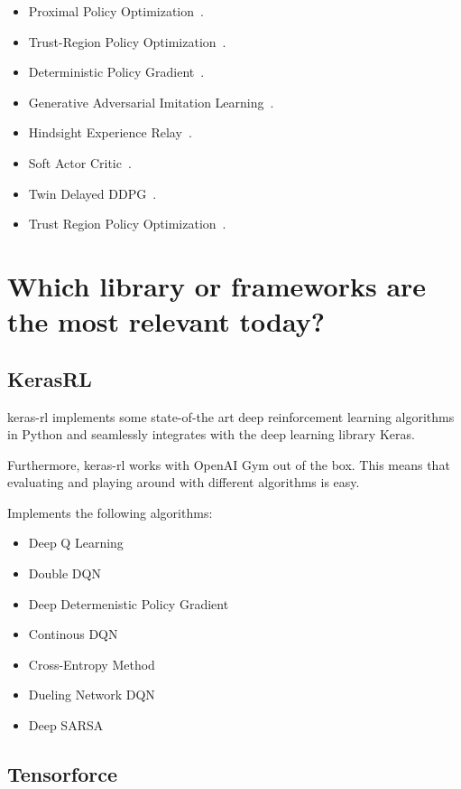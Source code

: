 \documentclass[letterpaper, 10 pt]{IEEEconf}
\begin{document}
\begin{itemize}
\item Proximal Policy Optimization~\cite{schulman2017proximal}.
  \item Trust-Region Policy Optimization~\cite{schulman2015trust}.
  \item Deterministic Policy Gradient~\cite{silver2014deterministic}.
  \item Generative Adversarial Imitation Learning~\cite{ho2016generative}.
  \item Hindsight Experience Relay~\cite{AndrychowiczWRS17}.
  \item Soft Actor Critic~\cite{abs-1801-01290}.
  \item Twin Delayed DDPG~\cite{dankwa2019twin}.
  \item Trust Region Policy Optimization~\cite{schulman2015trust}.
\end{itemize}


\section{Which library or frameworks are the most relevant today?}

\subsection{KerasRL}

keras-rl\cite{plappert2016kerasrl} implements some state-of-the art deep reinforcement learning
algorithms in Python and seamlessly integrates with the deep learning
library Keras.

Furthermore, keras-rl works with OpenAI Gym out of the box. This means
that evaluating and playing around with different algorithms is easy.

Implements the following algorithms:

\begin{itemize}
	\item Deep Q Learning
	\item Double DQN
	\item Deep Determenistic Policy Gradient
	\item Continous DQN
	\item Cross-Entropy Method
	\item Dueling Network DQN
	\item Deep SARSA
\end{itemize}

\subsection{Tensorforce}
\end{document}
